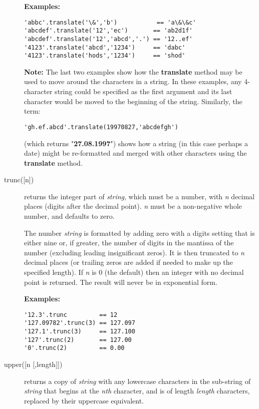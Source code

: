 \begin{description}
\textbf{Examples:}
\begin{lstlisting}
'abbc'.translate('\&','b')           == 'a\&\&c'
'abcdef'.translate('12','ec')       == 'ab2d1f'
'abcdef'.translate('12','abcd','.') == '12..ef'
'4123'.translate('abcd','1234')     == 'dabc'
'4123'.translate('hods','1234')     == 'shod'
\end{lstlisting}
\textbf{Note: }The last two examples show how the \textbf{translate} method
may be used to move around the characters in a string.
In these examples, any 4-character string could be specified as the
first argument and its last character would be moved to the beginning of
the string.
Similarly, the term:
\begin{lstlisting}
'gh.ef.abcd'.translate(19970827,'abcdefgh')
\end{lstlisting}
(which returns "\textbf{27.08.1997}") shows how a string (in
this case perhaps a date) might be re-formatted and merged with other
characters using the \textbf{translate} method.

\item[trunc([n{]})]\label{reftrunc}
returns the integer part of \emph{string}, which must be a
number, with \emph{n} decimal places (digits after the decimal
point).
\emph{n} must be a non-negative whole number, and defaults to zero.
 
The number \emph{string} is formatted by adding zero with a digits
setting that is either nine or, if greater, the number of digits in the
mantissa of the number (excluding leading insignificant zeros).
It is then truncated to \emph{n} decimal places (or trailing zeros
are added if needed to make up the specified length).
If \emph{n} is 0 (the default) then an integer with no decimal
point is returned.
The result will never be in exponential form.
 
\textbf{Examples:}
\begin{lstlisting}
'12.3'.trunc         == 12
'127.09782'.trunc(3) == 127.097
'127.1'.trunc(3)     == 127.100
'127'.trunc(2)       == 127.00
'0'.trunc(2)         == 0.00
\end{lstlisting}

\item[upper([n [,length{]]})]\label{refupper}
returns a copy of \emph{string} with any lowercase characters in
the sub-string of \emph{string} that begins at the \emph{n}\emph{th}
character, and is of length \emph{length} characters, replaced by
their uppercase equivalent.
 

\end{description}
